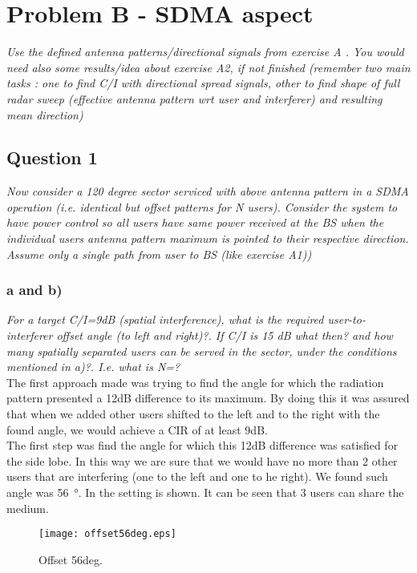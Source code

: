 \section{Problem B - SDMA aspect}
\textit{Use the defined antenna patterns/directional signals from exercise A . You would need also some results/idea about exercise A2, if not finished (remember two main tasks : one to find C/I with directional spread signals, other to find shape of full radar sweep (effective antenna pattern wrt user and interferer) and resulting mean direction)}

\subsection{Question 1}
\textit{Now consider a 120 degree sector serviced with above antenna pattern in a SDMA operation (i.e. identical but offset patterns for N users). Consider the system to have power control so all users have same power received at the BS when the individual users antenna pattern maximum is pointed to their respective direction. Assume only a single path from user to BS (like exercise A1))}

\subsubsection{a and b)}
\textit{For a target C/I=9dB (spatial interference), what is the required user-to-interferer offset angle (to left and right)?. If C/I is 15 dB what then? and how many spatially separated users can be served in the sector, under the conditions mentioned in a)?. I.e. what is N=?}\\

The first approach made was trying to find the angle for which the radiation pattern presented a 12dB difference to its maximum. By doing this it was assured that when we added other users shifted to the left and to the right with the found angle, we would achieve a CIR of at least 9dB.\\

The first step was find the angle for which this 12dB difference was satisfied for the side lobe. In this way we are sure that we would have no more than 2 other users that are interfering (one to the left and one to he right). We found such angle was \SI{56}{\degree}. In  the setting is shown. It can be seen that 3 users can share the medium.

\begin{figure}[!h]
  \centering
  \texttt{[image: offset56deg.eps]}
  \caption{Offset 56deg.}
  \label{fig:offset56deg}
\end{figure}


